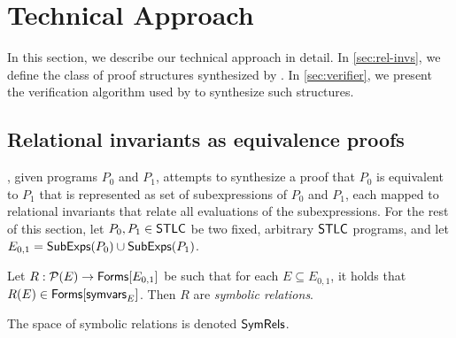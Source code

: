 \section{Technical Approach}
%
In this section, we describe our technical approach in detail.
%
In \autoref{sec:rel-invs}, we define the class of proof
structures synthesized by \sys.
%
In \autoref{sec:verifier}, we present the verification algorithm used
by \sys to synthesize such structures.

\subsection{Relational invariants as equivalence proofs}
\label{sec:rel-invs}
%
\sys, given programs $P_0$ and $P_1$, attempts to synthesize a proof
that $P_0$ is equivalent to $P_1$ that is represented as set of
subexpressions of $P_0$ and $P_1$, each mapped to relational
invariants that relate all evaluations of the subexpressions.
%
For the rest of this section, let $P_0, P_1 \in \mathsf{STLC}$ be two fixed,
arbitrary $\mathsf{STLC}$ programs, and let $E_{0, 1} = \mathsf{SubExps}(P_0) \cup
\mathsf{SubExps}(P_1)$.

\begin{defn}
  \label{defn:sym-rels}
  Let $R: \mathcal{P}(E) \to \mathsf{Forms}[  E_{0, 1}  ]$ be such that %
  for each $E \subseteq E_{0, 1}$, %
  it holds that $R(E) \in \mathsf{Forms}[  \mathsf{symvars}_{E}  ]$.
  Then $R$ are \emph{symbolic relations}.
\end{defn}
%
The space of symbolic relations is denoted $\mathsf{SymRels}$.


